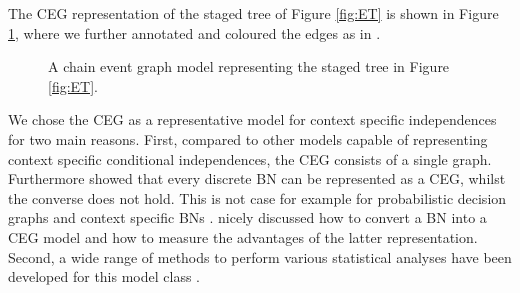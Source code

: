 \begin{example}
 The CEG representation of the staged tree of Figure \ref{fig:ET} is shown in Figure \ref{fig:CEG}, where we further annotated and coloured the edges as in \citet{Barclay2013a}. 
 \end{example}
 
\begin{figure}
\vspace{-.3cm}
\begin{center}
\end{center}
\vspace{-.5cm}
\caption{A chain event graph model representing the staged tree in Figure \ref{fig:ET}. \label{fig:CEG}}
\end{figure}

We chose the CEG as a representative model for context specific independences for two main reasons. First, compared to other models capable of  representing context specific conditional independences,  the CEG consists of a single graph. Furthermore   \citet{Smith2008} showed that every discrete BN can be represented as a CEG, whilst the converse does not hold. This is not case for example for probabilistic decision graphs \citep{Jaeger2004} and context specific BNs \citep{Boutilier1996}. \citet{Barclay2013a} nicely discussed how to convert a BN into a CEG model and how to measure the advantages of the latter representation. Second, a wide range of methods to perform various statistical analyses have been developed for this model class \citep[see e.g.][]{Barclay2013a,Barclay2014, Freeman2011, Thwaites2010, Thwaites2015}.

